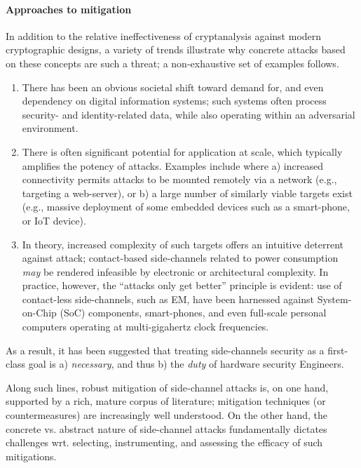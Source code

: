 \paragraph{Approaches to mitigation}

In addition to the relative ineffectiveness of cryptanalysis against modern
cryptographic designs, a variety of trends illustrate why concrete attacks
based on these concepts are such a threat; a non-exhaustive set of examples
follows.

\begin{enumerate}

\item There has been an obvious societal shift toward demand for, and even
      dependency on digital information systems; such systems often process
      security- and identity-related data, while also operating within an
      adversarial environment.

\item There is often significant potential for application at scale, which
      typically amplifies the potency of attacks.  Examples include where
      a) increased connectivity permits attacks to be mounted remotely via
         a network (e.g., targeting a web-server),
         or
      b) a large number of similarly viable targets exist (e.g., massive
         deployment of some embedded devices such as a smart-phone, or IoT
         device).

\item In   theory,
      increased complexity   of      such targets
      offers an intuitive deterrent against attack;
      contact-based side-channels related to power consumption {\em may} be
      rendered infeasible by electronic or architectural complexity.
      In practice,
      however, the ``attacks only get better'' principle is evident: use of
      contact-less side-channels, such as EM, have been harnessed against
      System-on-Chip (SoC) components, 
      smart-phones,
      and even
      full-scale personal computers
      operating at multi-gigahertz clock frequencies.

\end{enumerate}


\noindent
As a result, it has been suggested that treating side-channels security as a
first-class goal is
a) {\em necessary},
   and thus
b) the {\em duty} of hardware security Engineers.

Along such lines, robust mitigation of side-channel attacks is, on one hand,
supported by a rich, mature corpus of literature; mitigation techniques (or
countermeasures) are increasingly well understood.  On the other hand, the
concrete vs. abstract nature of side-channel attacks fundamentally dictates
challenges wrt. selecting, instrumenting, and assessing the efficacy of such
mitigations.


